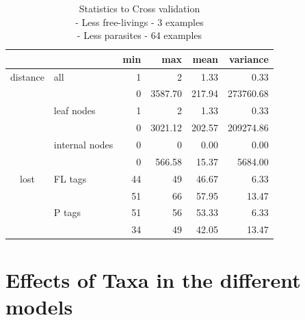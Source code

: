       \begin{table}
        \begin{center}
          \begin{tabular}{ |cl||r|r|r|r| }
            \hline
            & & min & max & mean & variance \\
            \hline \hline
            \rowcolor{green!50}distance & all   & 1 & 2 & 1.33 & 0.33 \\
            \rowcolor{orange!50}&               & 0 & 3587.70 & 217.94 & 273760.68 \\
            \rowcolor{green!50}& leaf nodes     & 1 & 2 & 1.33 & 0.33 \\
            \rowcolor{orange!50}&               & 0 & 3021.12 & 202.57 & 209274.86 \\
            \rowcolor{green!50}& internal nodes& 0 & 0 & 0.00 & 0.00 \\
            \rowcolor{orange!50}&               & 0 & 566.58 & 15.37 & 5684.00 \\ \hline
            \rowcolor{green!50}lost & FL tags   & 44 & 49 & 46.67 & 6.33 \\
            \rowcolor{orange!50}&               & 51 & 66 & 57.95 & 13.47 \\
            \rowcolor{green!50}& P tags         & 51 & 56 & 53.33 & 6.33 \\
            \rowcolor{orange!50}&               & 34 & 49 & 42.05 & 13.47 \\
            \hline
          \end{tabular}
        \end{center}
        \caption{Statistics to Cross validation \\
          - \colorbox{green!50}{Less free-livings - 3 examples} \\
          - \colorbox{orange!50}{Less parasites - 64 examples}}
      \end{table}

  \section{Effects of Taxa in the different models}

     \\ \\


